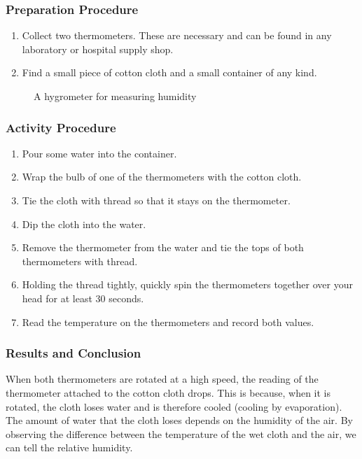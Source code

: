 \subsubsection*{Preparation Procedure}
\begin{enumerate}
\item{Collect two thermometers.  These are necessary and can be found in any laboratory or hospital supply shop.}
\item{Find a small piece of cotton cloth and a small container of any kind.}
\end{enumerate}

\begin{figure}
\begin{center}
\def\svgwidth{100pt}

\caption{A hygrometer for measuring humidity}
\label{fig:hygrometer}
\end{center}
\end{figure}

\subsubsection*{Activity Procedure}
\begin{enumerate}
\item{Pour some water into the container.}
\item{Wrap the bulb of one of the thermometers with the cotton cloth.}
\item{Tie the cloth with thread so that it stays on the thermometer.}
\item{Dip the cloth into the water.}
\item{Remove the thermometer from the water and tie the tops of both thermometers with thread.}
\item{Holding the thread tightly, quickly spin the thermometers together over your head for at least 30 seconds.}
\item{Read the temperature on the thermometers and record both values.}
\end{enumerate}

\subsubsection*{Results and Conclusion}
When both thermometers are rotated at a high speed, the reading of the thermometer attached to the cotton cloth drops.  This is because, when it is rotated, the cloth loses water and is therefore cooled (cooling by evaporation).  The amount of water that the cloth loses depends on the humidity of the air.  By observing the difference between the temperature of the wet cloth and the air, we can tell the relative humidity.

